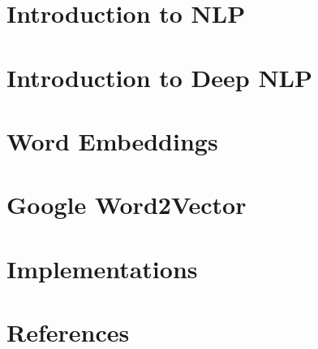 \section[Intro]{Introduction to NLP}


\section[DNLP]{Introduction to Deep NLP}


\section[Embedding]{Word Embeddings}



\section[W2V]{Google Word2Vector}




\section[Impl]{Implementations}


\section[Refs]{References}


